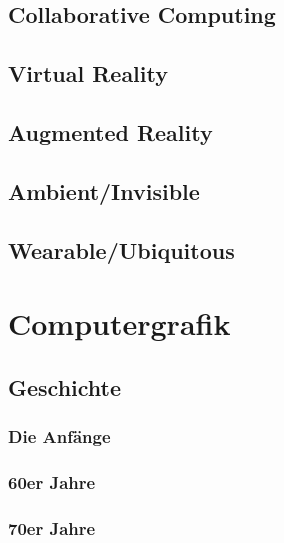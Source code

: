 \documentclass[a4paper, 11pt, accentcolor = tud3b]{tudreport}
\begin{document}
			\subsection{Collaborative Computing} %

			\subsection{Virtual Reality} %

			\subsection{Augmented Reality} %

			\subsection{Ambient/Invisible} %

			\subsection{Wearable/Ubiquitous} %

		\section{Computergrafik} %

			\subsection{Geschichte} %

				\subsubsection{Die Anfänge} %

				\subsubsection{60er Jahre} %

				\subsubsection{70er Jahre} %
\end{document}
